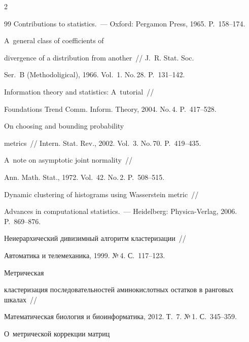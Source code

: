 \begin{multicols}{2}
{{\begin{thebibliography}{99}
{Contributions to statistics}.~--- Oxford: Pergamon Press, 1965. P.~158--174.


     A~general class of coefficients of

    divergence of a distribution from another~// J.~R. Stat. Soc.

    Ser.~B (Methodoligical),  1966. Vol.~1. No.\,28. P.~131--142.


 Information theory and statistics: A~tutorial~//

Foundations Trend Comm. Inform. Theory, 2004. No.\,4. P.~417--528.


 On choosing and bounding probability

metrics~// Intern. Stat. Rev., 2002. Vol.~3. No.\,70. P.~419--435.


  A~note on asymptotic joint normality~//

Ann. Math. Stat., 1972. Vol.~42. No.\,2. P.~508--515.



    Dynamic clustering of histograms using Wasserstein metric~//

    Advances in computational statistics.~--- Heidelberg: Physica-Verlag, 2006. P.~869--876.


 Неиерархический дивизимный алгоритм кластеризации~//

Автоматика и телемеханика, 1999. №\,4. С.~117--123.




 Метрическая

кластеризация последовательностей аминокислотных остатков в ранговых шкалах~//

Математическая биология и биоинформатика, 2012. Т.~7. №\,1. С.~345--359.


 О~метрической коррекции мат\-риц


\end{thebibliography}}}
\end{multicols}
